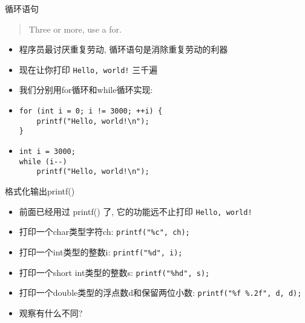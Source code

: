 \begin{frame}[fragile]{循环语句}
\begin{quote}
Three or more, use a for.
\end{quote}

\begin{itemize}[<+- | alert@+>]
\item 程序员最讨厌重复劳动, 循环语句是消除重复劳动的利器
\item 现在让你打印 \texttt{Hello, world!} 三千遍
\item 我们分别用for循环和while循环实现:
\item \begin{verbatim}
for (int i = 0; i != 3000; ++i) {
    printf("Hello, world!\n");
}
\end{verbatim}
\item \begin{verbatim}
int i = 3000;
while (i--)
    printf("Hello, world!\n");
\end{verbatim}

\end{itemize}
\end{frame}

\begin{frame}[fragile]{格式化输出printf()}
\begin{itemize}[<+- | alert@+>]
\item 前面已经用过 printf() 了, 它的功能远不止打印 \texttt{Hello, world!}
\item 打印一个char类型字符ch: \texttt{printf("\%c", ch);}
\item 打印一个int类型的整数i: \texttt{printf("\%d", i);}
\item 打印一个short int类型的整数s: \texttt{printf("\%hd", s);}
\item 打印一个double类型的浮点数d和保留两位小数: \texttt{printf("\%f \%.2f", d, d);}
\item 观察有什么不同?
\end{itemize}
\end{frame}

